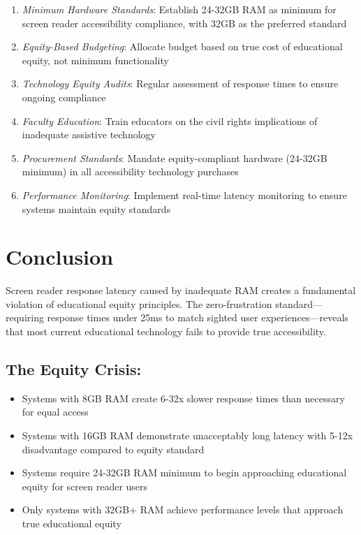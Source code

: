 \begin{enumerate}
\item \emph{Minimum Hardware Standards}: Establish 24-32GB RAM as minimum for screen reader accessibility compliance, with 32GB as the preferred standard
\item \emph{Equity-Based Budgeting}: Allocate budget based on true cost of educational equity, not minimum functionality
\item \emph{Technology Equity Audits}: Regular assessment of response times to ensure ongoing compliance
\item \emph{Faculty Education}: Train educators on the civil rights implications of inadequate assistive technology
\item \emph{Procurement Standards}: Mandate equity-compliant hardware (24-32GB minimum) in all accessibility technology purchases
\item \emph{Performance Monitoring}: Implement real-time latency monitoring to ensure systems maintain equity standards
\end{enumerate}

\section{Conclusion}\label{chapter1-conclusion}

Screen reader response latency caused by inadequate RAM creates a fundamental violation of educational equity principles. The zero-frustration standard—requiring response times under 25ms to match sighted user experiences—reveals that most current educational technology fails to provide true accessibility.

\subsection{The Equity Crisis:}

\begin{itemize}
\item Systems with 8GB RAM create 6-32x slower response times than necessary for equal access
\item Systems with 16GB RAM demonstrate unacceptably long latency with 5-12x disadvantage compared to equity standard
\item Systems require 24-32GB RAM minimum to begin approaching educational equity for screen reader users
\item Only systems with 32GB+ RAM achieve performance levels that approach true educational equity
\end{itemize}

